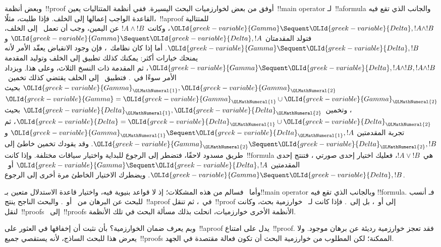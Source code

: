 \documentclass[../../../include/open-logic-section]{subfiles}
\begin{document}
وبعض أنظمة~!!{proof} أوفق من بعض لخوارزميات البحث اليسيرة. ففي أنظمة
المتتاليات يعين~!!{main operator} لـ~!!a{formula} والجانب الذي تقع فيه
القاعدة الواجب إعمالها إلى الخلف. فإذا طلبت، مثلًا،~!!a{proof} للمتتالية
$\OLId{greek-variable}{Gamma} \Sequent \OLId{greek-variable}{Delta},!A\land !B$، وكانت~$!A\land !B$ عن اليمين،
وجب أن تعمل~\RightR{\land} إلى الخلف، فتولد المقدمتان
$\OLId{greek-variable}{Gamma} \Sequent \OLId{greek-variable}{Delta},!A$ و
$\OLId{greek-variable}{Gamma} \Sequent \OLId{greek-variable}{Delta},!B$. أما إذا كان نظامك~، فإن وجود
الانقباض يعقّد الأمر لأنه يمنحك خيارات أكثر: يمكنك كذلك تطبيق
\RightR{\Contraction} إلى الخلف وتوليد المقدمة
$\OLId{greek-variable}{Gamma} \Sequent \OLId{greek-variable}{Delta},!A\land !B,!A\land !B$، ثم المقدمة ذات النسخ
الثلاث، وعلى هذا. ويزداد الأمر سوءًا في~. فتطبيق~\RightR{\land} إلى
الخلف يقتضي كذلك تخمين~$\OLId{greek-variable}{Gamma}_\OLMathNumeral{1},\OLId{greek-variable}{Gamma}_\OLMathNumeral{2}$ بحيث
$\OLId{greek-variable}{Gamma}=\OLId{greek-variable}{Gamma}_\OLMathNumeral{1}\cup\OLId{greek-variable}{Gamma}_\OLMathNumeral{2}$، وتخمين~$\OLId{greek-variable}{Delta}_\OLMathNumeral{1},\OLId{greek-variable}{Delta}_\OLMathNumeral{2}$ بحيث
$\OLId{greek-variable}{Delta}=\OLId{greek-variable}{Delta}_\OLMathNumeral{1}\cup\OLId{greek-variable}{Delta}_\OLMathNumeral{2}$، ثم تجربة المقدمتين
$\OLId{greek-variable}{Gamma}_\OLMathNumeral{1}\Sequent\OLId{greek-variable}{Delta}_\OLMathNumeral{1},!A$ و$\OLId{greek-variable}{Gamma}_\OLMathNumeral{2}\Sequent\OLId{greek-variable}{Delta}_\OLMathNumeral{2},!B$. وقد يقودك
تخمين خاطئ إلى طريق مسدود لاحقًا، فتضطر إلى الرجوع للبداية واختيار سياقات
مختلفة. وإذا كانت~!!{formula} هي~$!A\lor !B$، فعليك اختيار إحدى صورتي
\RightR{\lor}، فتنتج إحدى المقدمتين
$\OLId{greek-variable}{Gamma}\Sequent\OLId{greek-variable}{Delta},!A$ أو~$\OLId{greek-variable}{Gamma}\Sequent\OLId{greek-variable}{Delta},!B$. ويضطرك الاختيار
الخاطئ مرة أخرى إلى الرجوع.

وأما~ فسالم من هذه المشكلات؛ إذ لا قواعد بنيوية فيه، واختيار
قاعدة الاستدلال متعين بـ!!{main operator} وبالجانب الذي تقع فيه
!!{formula}. فـ أنسب للبحث عن البرهان من~ أو~.
والبحث الناجح ينتج~!!a{proof} في~، ثم تنقل~!!{proof} إلى
 أو~، بل إلى~. فإذا كانت لـ~
خوارزمية بحث، وكانت لنقل~!!{proof}s~ إلى~!!{proof}s الأنظمة
الأخرى خوارزميات، انحلت بذلك مسألة البحث في تلك الأنظمة.

وبم يعرف ضمان الخوارزمية؟ بأن نثبت أن إخفاقها في العثور على~!!a{proof}
يدل على امتناع~!!{proof}. فقد تعجز خوارزمية رديئة عن برهان موجود. ولا
يعرض هذا للبحث الساذج، لأنه يستقصي جميع~!!{proof}s الممكنة؛ لكن المطلوب
من خوارزمية البحث أن تكون فعالة مقتصدة في الجهد.
\end{document}
